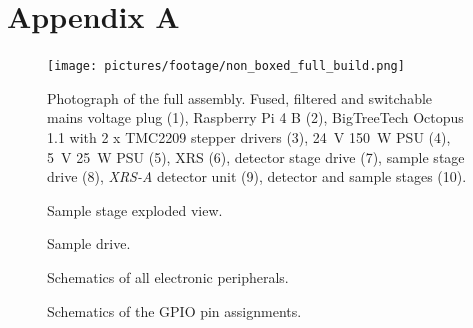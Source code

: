 \chapter{Appendix A}\label{sec:appendix a}
    
    \newpage
    \begin{figure}[ht]
        \centering
        \texttt{[image: pictures/footage/non\_boxed\_full\_build.png]}
        \caption[Photograph of the full assembly]{Photograph of the full assembly. Fused, filtered and switchable mains voltage plug (1), Raspberry Pi 4 B (2), BigTreeTech Octopus 1.1 with 2 x TMC2209 stepper drivers (3), \qty{24}{\volt} \qty{150}{\watt} PSU (4), \qty{5}{\volt} \qty{25}{\watt} PSU (5), XRS (6), detector stage drive (7), sample stage drive (8), \textit{XRS-A} detector unit (9), detector and sample stages (10).}%
        \label{fig:non boxed full assembly}
    \end{figure}
    \newpage
    \begin{figure}[ht]
        \centering
        \caption[Sample stage exploded view]{Sample stage exploded view.}%
        \label{fig:sample stage exploded}%
    \end{figure}
    \newpage
    \begin{figure}[ht]
        \centering
        \caption[Sample drive]{Sample drive.}%
        \label{fig:sample drive}%
    \end{figure}
    \newpage
    \begin{figure}[ht]
        \centering
        
        \caption[Schematics of all electronic peripherals]{Schematics of all electronic peripherals.}%
        \label{fig:schematics of peripherals}
    \end{figure}
    \newpage
    \begin{figure}[ht]
        \centering
        
        \caption[Schematics of the GPIO pin assignments]{Schematics of the GPIO pin assignments.}%
        \label{fig:schematics of raspberry gpio configuration}
    \end{figure}
